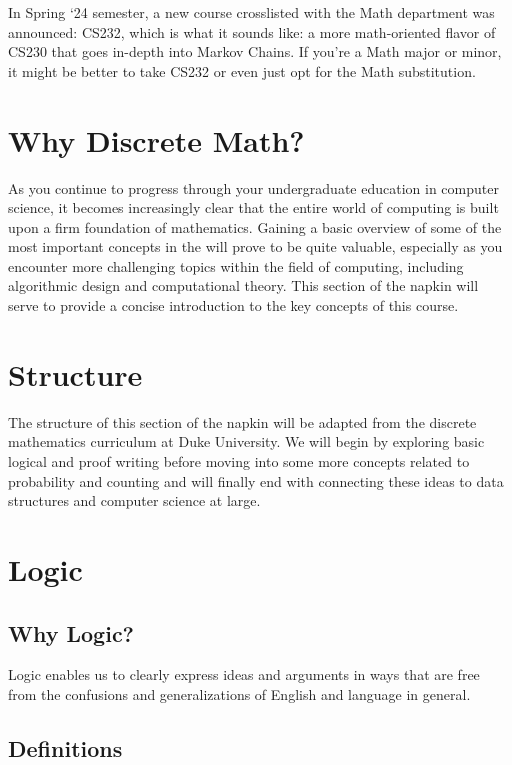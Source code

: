 \documentclass[fontsize=12pt,twoside=on,openright,parskip=half]{scrbook}
\begin{document}
In Spring ‘24 semester, a new course crosslisted with the Math department was
announced: CS232, which is what it sounds like: a more math-oriented flavor of
CS230 that goes in-depth into Markov Chains. If you’re a Math major or minor,
it might be better to take CS232 or even just opt for the Math substitution.

\section*{Why Discrete Math?}

As you continue to progress through your undergraduate education in computer
science, it becomes increasingly clear that the entire world of computing is
built upon a firm foundation of mathematics. Gaining a basic overview of some
of the most important concepts in the will prove to be quite valuable,
especially as you encounter more challenging topics within the field of
computing, including algorithmic design and computational theory. This section
of the napkin will serve to provide a concise introduction to the key concepts
of this course. 

\section*{Structure}

The structure of this section of the napkin will be adapted from the discrete
mathematics curriculum at Duke University. We will begin by exploring basic
logical and proof writing before moving into some more concepts related to
probability and counting and will finally end with connecting these ideas to
data structures and computer science at large.

\section*{Logic}

\subsection*{Why Logic?}

Logic enables us to clearly express ideas and arguments in ways that are free
from the confusions and generalizations of English and language in general.

\subsection*{Definitions}
\end{document}
